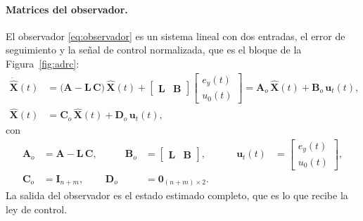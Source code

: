 \paragraph{Matrices del observador.} El observador
\eqref{eq:observador} es un sistema lineal con dos entradas, el error de
seguimiento y la señal de control normalizada, que es el bloque de la
Figura~\ref{fig:adrc}:
\begin{equation}
\begin{aligned}
\dot{\widehat{\mathbf{X}}}(t) &=
\bigl(\mathbf{A} - \mathbf{L}\,\mathbf{C}\bigr)\,\widehat{\mathbf{X}}(t)
+ \begin{bmatrix} \mathbf{L} & \mathbf{B} \end{bmatrix}
\begin{bmatrix} e_y(t) \\ u_0(t) \end{bmatrix}
= \mathbf{A}_o\,\widehat{\mathbf{X}}(t) + \mathbf{B}_o\,\mathbf{u}_t(t), \\
\widehat{\mathbf{X}}(t) &= \mathbf{C}_o\,\widehat{\mathbf{X}}(t) + \mathbf{D}_o\,\mathbf{u}_t(t),
\end{aligned}
\label{eq:observador_bloque}
\end{equation}
con
\begin{equation}
\begin{aligned}
\mathbf{A}_o &= \mathbf{A} - \mathbf{L}\,\mathbf{C}, & \qquad
\mathbf{B}_o &= \begin{bmatrix} \mathbf{L} & \mathbf{B} \end{bmatrix}, & \qquad
\mathbf{u}_t(t) &= \begin{bmatrix} e_y(t) \\ u_0(t) \end{bmatrix}, \\[0.5em]
\mathbf{C}_o &= \mathbf{I}_{n+m}, &
\mathbf{D}_o &= \mathbf{0}_{(n+m) \times 2}. & &
\end{aligned}
\label{eq:observador_matrices}
\end{equation}
La salida del observador es el estado estimado completo, que es lo que recibe la
ley de control.

